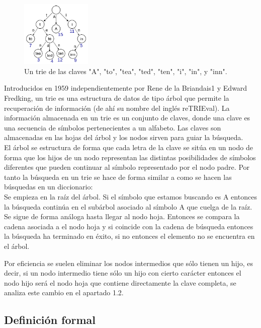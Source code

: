 \documentclass[es]{ifirak}
\begin{document}
\begin{figure}
	\centering
	\includegraphics[width=0.3\textwidth]{trie1.png}
	\caption{Un trie de las claves "A", "to", "tea", "ted", "ten", "i",  "in", y "inn".}\label{figure}
\end{figure}
\large{
 Introducidos en 1959 independientemente por Rene de la Briandais1 y Edward Fredking, un trie es una estructura de datos de tipo árbol que permite la recuperación de información (de ahí su nombre del inglés reTRIEval). La información almacenada en un trie es un conjunto de claves, donde una clave es una secuencia de símbolos pertenecientes a un alfabeto. Las claves son almacenadas en las hojas del árbol y los nodos sirven para guiar la búsqueda.\\
 
 El árbol se estructura de forma que cada letra de la clave se sitúa en un nodo de forma que los hijos de un nodo representan las distintas posibilidades de símbolos diferentes que pueden continuar al símbolo representado por el nodo padre. Por tanto la búsqueda en un trie se hace de forma similar a como se hacen las búsquedas en un diccionario:\\
 
 Se empieza en la raíz del árbol. Si el símbolo que estamos buscando es A entonces la búsqueda continúa en el subárbol asociado al símbolo A que cuelga de la raíz. Se sigue de forma análoga hasta llegar al nodo hoja. Entonces se compara la cadena asociada a el nodo hoja y si coincide con la cadena de búsqueda entonces la búsqueda ha terminado en éxito, si no entonces el elemento no se encuentra en el árbol.
 
 Por eficiencia se suelen eliminar los nodos intermedios que sólo tienen un hijo, es decir, si un nodo intermedio tiene sólo un hijo con cierto carácter entonces el nodo hijo será el nodo hoja que contiene directamente la clave completa, se analiza este cambio en el apartado 1.2.}
\subsection{Definición formal}
\end{document}
